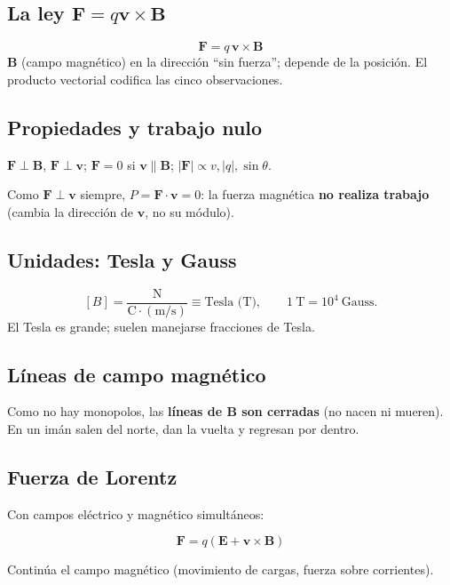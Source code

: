 \documentclass[12pt,a4paper]{article}
\begin{document}
\subsection{La ley $\mathbf{F} = q\mathbf{v}\times\mathbf{B}$}

\begin{keybox}
  \[
  \boxed{\mathbf{F} = q\, \mathbf{v}\times\mathbf{B}}
  \]
  $\mathbf{B}$ (campo magnético) en la dirección \enquote{sin fuerza};
  depende de la posición. El producto vectorial codifica las cinco
  observaciones.
\end{keybox}



\subsection{Propiedades y trabajo nulo}

$\mathbf{F}\perp\mathbf{B}$, $\mathbf{F}\perp\mathbf{v}$; $\mathbf{F}=0$
si $\mathbf{v}\parallel\mathbf{B}$; $|\mathbf{F}|\propto v,|q|,\sin\theta$.

\begin{keybox}
  Como $\mathbf{F}\perp\mathbf{v}$ siempre, $P=\mathbf{F}\cdot\mathbf{v}=0$:
  la fuerza magnética \textbf{no realiza trabajo} (cambia la dirección de
  $\mathbf{v}$, no su módulo).
\end{keybox}

\subsection{Unidades: Tesla y Gauss}

\[
[B] = \frac{\text{N}}{\text{C}\cdot(\text{m/s})} \equiv \text{Tesla (T)},
\qquad 1\ \text{T} = 10^{4}\ \text{Gauss}.
\]
El Tesla es grande; suelen manejarse fracciones de Tesla.

\subsection{Líneas de campo magnético}

Como no hay monopolos, las \textbf{líneas de $\mathbf{B}$ son cerradas}
(no nacen ni mueren). En un imán salen del norte, dan la vuelta y
regresan por dentro.



\subsection{Fuerza de Lorentz}

Con campos eléctrico y magnético simultáneos:

\begin{keybox}
  \[
  \boxed{\mathbf{F} = q\left(\mathbf{E} + \mathbf{v}\times\mathbf{B}\right)}
  \]
\end{keybox}

\begin{notebox}
  Continúa el campo magnético (movimiento de cargas, fuerza sobre
  corrientes).
\end{notebox}
\end{document}
